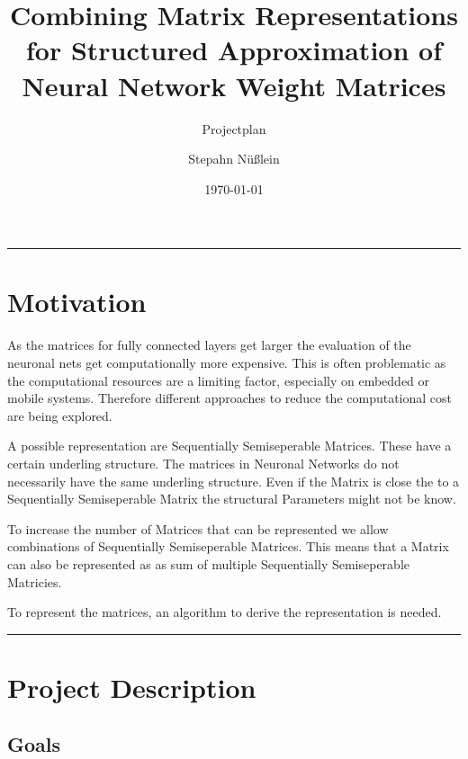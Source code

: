 \documentclass[lang=ngerman,inputenc=utf8,fontsize=10pt]{ldvarticle}
\title{Combining Matrix Representations for Structured Approximation of Neural Network Weight Matrices}
\subtitle{Projectplan}
\author{Stepahn Nüßlein}
\date{\today}
\begin{document}
	\maketitle
	\thispagestyle{empty}
	\vspace*{2cm}
	\hrule

\section*{Motivation}

As the matrices for fully connected layers get larger the evaluation of the neuronal nets get computationally more expensive. This is often problematic as the computational resources are a limiting factor, especially on embedded or mobile systems.
Therefore different approaches to reduce the computational cost are being explored.

A possible representation are Sequentially Semiseperable Matrices. These have a certain underling structure.
The matrices in Neuronal Networks do not necessarily have the same underling structure.
Even if the Matrix is close the to a Sequentially Semiseperable Matrix the structural Parameters might not be know.

To increase the number of Matrices that can be represented we allow combinations of Sequentially Semiseperable Matrices.
This means that a Matrix can also be represented as as sum of multiple Sequentially Semiseperable Matricies.

To represent the matrices, an algorithm to derive the representation is needed.




\vspace*{1cm}
\hrule

\newpage

\section{Project Description}

\subsection*{Goals}
\end{document}
